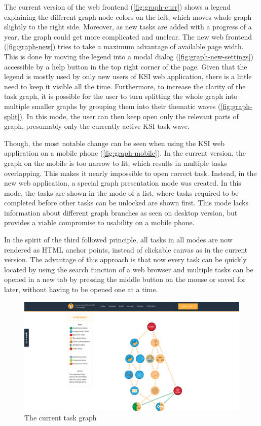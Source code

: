 \documentclass[
  digital, %
  oneside, %
  lof,     %
  lot,     %
]{fithesis4}
\begin{document}
{The current version of the web frontend (\autoref{fig:graph-curr}) shows a legend explaining the different graph node colors on the left, which moves whole graph slightly to the right side. Moreover, as new tasks are added with a progress of a year, the graph could get more complicated and unclear. The new web frontend (\autoref{fig:graph-new}) tries to take a maximum advantage of available page width. This is done by moving the legend into a modal dialog (\autoref{fig:graph-new-settings}) accessible by a help button in the top right corner of the page. Given that the legend is mostly used by only new users of KSI web application, there is a little need to keep it visible all the time. Furthermore, to increase the clarity of the task graph, it is possible for the user to turn splitting the whole graph into multiple smaller graphs by grouping them into their thematic waves (\autoref{fig:graph-split}). In this mode, the user can then keep open only the relevant parts of graph, presumably only the currently active KSI task wave.

Though, the most notable change can be seen when using the KSI web application on a mobile phone (\autoref{fig:graph-mobile}). In the current version, the graph on the mobile is too narrow to fit, which results in multiple tasks overlapping. This makes it nearly impossible to open correct task. Instead, in the new web application, a special graph presentation mode was created. In this mode, the tasks are shown in the mode of a list, where tasks required to be completed before other tasks can be unlocked are shown first. This mode lacks information about different graph branches as seen on desktop version, but provides a viable compromise to usability on a mobile phone.

In the spirit of the third followed principle, all tasks in all modes are now rendered as HTML anchor points, instead of clickable canvas as in the current version. The advantage of this approach is that now every task can be quickly located by using the search function of a web browser and multiple tasks can be opened in a new tab by pressing the middle button on the mouse or saved for later, without having to be opened one at a time.

\begin{figure}
\includegraphics[width=\textwidth]{assets/img/graph_curr}
\caption{The current task graph}
\label{fig:graph-curr}
\end{figure}

}
\end{document}
